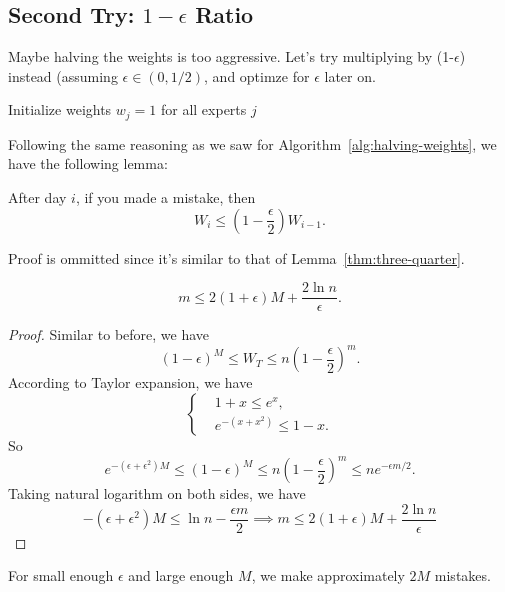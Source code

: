 \subsection{Second Try: $1 - \epsilon$ Ratio}

Maybe halving the weights is too aggressive. Let's try multiplying by (1-$\epsilon$) instead (assuming $\epsilon \in (0, 1/2)$, and optimze for $\epsilon$ later on.

\begin{algorithm}[H]
	\caption{Deterministic MWU Algorithm}
	\label{alg:deterministic-weights}
	Initialize weights $w_j = 1$ for all experts $j$\;
\end{algorithm}

Following the same reasoning as we saw for Algorithm~\ref{alg:halving-weights}, we have the following lemma:

\begin{lemma}\label{thm:one-minus-eps}
	After day $i$, if you made a mistake, then
	\[ W_i \leq \left(1 - \frac{\epsilon}{2}\right) W_{i-1}. \]
\end{lemma}
Proof is ommitted since it's similar to that of Lemma~\ref{thm:three-quarter}.

\begin{theorem}
	\[ m \leq 2(1+\epsilon) M + \frac{2 \ln n}{\epsilon}. \]
\end{theorem}

\begin{proof}
	Similar to before, we have
	\[ (1 - \epsilon)^M \leq W_T \leq n \left(1 - \frac{\epsilon}{2}\right)^m. \]
	According to Taylor expansion, we have
	\[ \left\{ \begin{aligned}
			 & 1+x \leq e^x,           \\
			 & e^{-(x+x^2)}\leq 1 - x.
		\end{aligned} \right. \]
	So
	\[ e^{-(\epsilon + \epsilon^2) M} \leq (1-\epsilon)^M \leq n \left(1 - \frac{\epsilon}{2}\right)^m \leq n e^{-\epsilon m/2}. \]
	Taking natural logarithm on both sides, we have
	\[ -(\epsilon + \epsilon^2) M \leq \ln n - \frac{\epsilon m}{2} \implies m \leq 2(1+\epsilon) M + \frac{2 \ln n}{\epsilon}\]
\end{proof}

\begin{remark}
	For small enough $\epsilon$ and large enough $M$, we make approximately $2M$ mistakes.
\end{remark}

